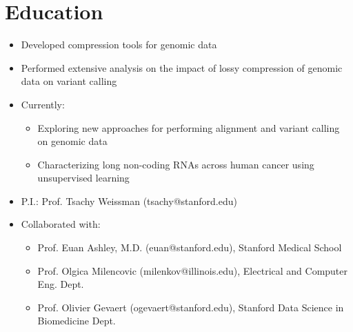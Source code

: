 \documentclass[11pt,a4paper,sans]{moderncv}        %
\begin{document}
\makecvtitle
\vspace{-25pt}
\vspace{-5pt}

\section{Education}




\begin{itemize}
 \item Developed compression tools for genomic data
 \item Performed extensive analysis on the impact of lossy compression of genomic data on variant calling
 \item Currently:
 \begin{itemize} 
 \item Exploring new approaches for performing alignment and variant calling on genomic data
 \item Characterizing long non-coding RNAs across human cancer using unsupervised learning
 \end{itemize}
  \item P.I.: Prof. Tsachy Weissman (tsachy@stanford.edu)
  \item Collaborated with: 
  \begin{itemize}
  \item Prof. Euan Ashley, M.D. (euan@stanford.edu), Stanford Medical School
  \item Prof. Olgica Milencovic (milenkov@illinois.edu), Electrical and Computer Eng. Dept.
  \item Prof. Olivier Gevaert (ogevaert@stanford.edu), Stanford Data Science in Biomedicine Dept.
  \end{itemize}
\end{itemize}

\end{document}
